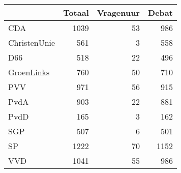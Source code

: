 \begin{tabular}{lrrr}
\toprule
{} &  Totaal &  Vragenuur &  Debat \\
\midrule
CDA          &    1039 &         53 &    986 \\
ChristenUnie &     561 &          3 &    558 \\
D66          &     518 &         22 &    496 \\
GroenLinks   &     760 &         50 &    710 \\
PVV          &     971 &         56 &    915 \\
PvdA         &     903 &         22 &    881 \\
PvdD         &     165 &          3 &    162 \\
SGP          &     507 &          6 &    501 \\
SP           &    1222 &         70 &   1152 \\
VVD          &    1041 &         55 &    986 \\
\bottomrule
\end{tabular}
